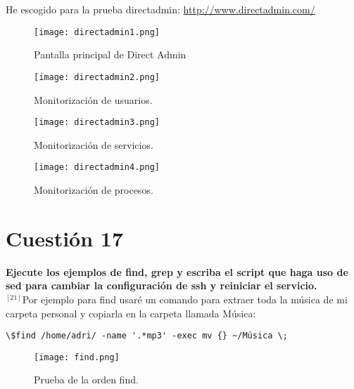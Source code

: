 \documentclass[a4paper, 11pt]{article} %
\begin{document}
He escogido para la prueba directadmin: \url{http://www.directadmin.com/}

\begin{figure}[h]
\centering 
\texttt{[image: directadmin1.png]} 
\caption{Pantalla principal de Direct Admin} 
\vspace{-0.5cm}
\label{contexto:figura} 
\end{figure}

\begin{figure}[h]
\centering 
\texttt{[image: directadmin2.png]} 
\caption{Monitorización de usuarios.} 
\vspace{-0.5cm}
\label{contexto:figura} 
\end{figure}

\begin{figure}[h]
\centering 
\texttt{[image: directadmin3.png]} 
\caption{Monitorización de servicios.} 
\vspace{-0.5cm}
\label{contexto:figura} 
\end{figure}

\begin{figure}[h]
\centering 
\texttt{[image: directadmin4.png]} 
\caption{Monitorización de procesos.} 
\vspace{-0.5cm}
\label{contexto:figura} 
\end{figure}

\pagebreak

\section{Cuestión 17}
\textbf{Ejecute los ejemplos de find, grep y escriba el script que haga uso de sed para cambiar la configuración de ssh y reiniciar el servicio.}\\

$^{[21]}$Por ejemplo para find usaré un comando para extraer toda la música de mi carpeta personal y copiarla en la carpeta llamada Música:
\begin{verbatim}
\$find /home/adri/ -name '.*mp3' -exec mv {} ~/Música \;
\end{verbatim}

\begin{figure}[h]
\centering 
\texttt{[image: find.png]} 
\caption{Prueba de la orden find.} 
\vspace{-0.5cm}
\label{contexto:figura} 
\end{figure}
\end{document}
